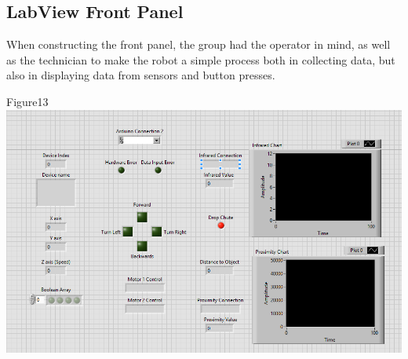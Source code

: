 \documentclass{article}
\begin{document}
\subsection{LabView Front Panel}
When constructing the front panel, the group had the operator in mind, as well as the technician to make the robot a simple process both in collecting data, but also in displaying data from sensors and button presses. 
\begin{center}{Figure13 \includegraphics[width=\textwidth]{FrontPanel.png}}\end{center}
\end{document}
